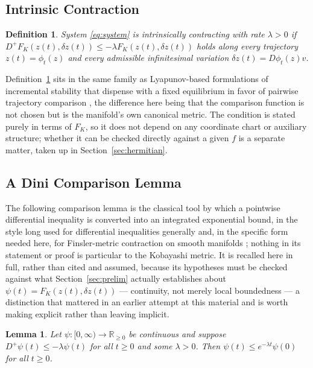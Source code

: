 \documentclass[preprint,12pt,authoryear]{elsarticle}
\newtheorem{lemma}{Lemma} %
\newtheorem{definition}{Definition}
\begin{document}
\subsection{Intrinsic Contraction}

\begin{definition}
\label{def:intrinsiccontraction}
System \eqref{eq:system} is intrinsically contracting with rate $\lambda>0$ if $D^+F_K(z(t),\delta z(t))\le -\lambda F_K(z(t),\delta z(t))$ holds along every trajectory $z(t)=\phi_t(z)$ and every admissible infinitesimal variation $\delta z(t)=D\phi_t(z)v$.
\end{definition}

Definition~\ref{def:intrinsiccontraction} sits in the same family as Lyapunov-based formulations of incremental stability that dispense with a fixed equilibrium in favor of pairwise trajectory comparison \cite{angeli2002lyapunov}, the difference here being that the comparison function is not chosen but is the manifold's own canonical metric. The condition is stated purely in terms of $F_K$, so it does not depend on any coordinate chart or auxiliary structure; whether it can be checked directly against a given $f$ is a separate matter, taken up in Section~\ref{sec:hermitian}.

\subsection{A Dini Comparison Lemma}

The following comparison lemma is the classical tool by which a pointwise differential inequality is converted into an integrated exponential bound, in the style long used for differential inequalities generally \cite{lohmiller1998contraction} and, in the specific form needed here, for Finsler-metric contraction on smooth manifolds \cite{forni2014differential}; nothing in its statement or proof is particular to the Kobayashi metric. It is recalled here in full, rather than cited and assumed, because its hypotheses must be checked against what Section~\ref{sec:prelim} actually establishes about $\psi(t)=F_K(z(t),\delta z(t))$ — continuity, not merely local boundedness — a distinction that mattered in an earlier attempt at this material and is worth making explicit rather than leaving implicit.

\begin{lemma}
\label{lem:dini}
Let $\psi:[0,\infty)\to\mathbb{R}_{\ge0}$ be continuous and suppose $D^+\psi(t)\le-\lambda\psi(t)$ for all $t\ge0$ and some $\lambda>0$. Then $\psi(t)\le e^{-\lambda t}\psi(0)$ for all $t\ge0$.
\end{lemma}
\end{document}
